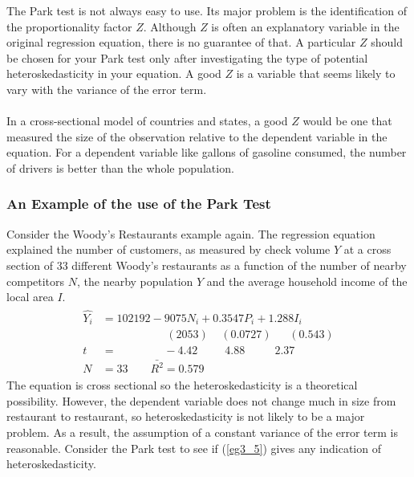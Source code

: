 \documentclass[11pt]{article}
\begin{document}
The Park test is not always easy to use. Its major problem is the identification of the proportionality factor $Z$. Although $Z$ is often an explanatory variable in the original regression equation, there is no guarantee of that. A particular $Z$ should be chosen for your Park test only after investigating the type of potential heteroskedasticity in your equation. A good $Z$ is a variable that seems likely to vary with the variance of the error term. \\ \\In a cross-sectional model of countries and states, a good $Z$ would be one that measured the size of the observation relative to the dependent variable in the equation. For a dependent variable like gallons of gasoline consumed, the number of drivers is better than the whole population. 
\subsubsection{An Example of the use of the Park Test}
Consider the Woody's Restaurants example again. The regression equation explained the number of customers, as measured by check volume $Y$ at a cross section of 33 different Woody's restaurants as a function of the number of nearby competitors $N$, the nearby population $Y$ and the average household income of the local area $I$. 
\begin{align}
\label{eg3_5}
\begin{split}
\hat{Y_i} &= 102192 - {9075N_i} + {0.3547P_i} + {1.288 I_i}\\
&\>\>\>\>\>\>\>\>\>\>\>\>\>\>\>\>\>\>\>\>\>\>\>\>\>\> (2053) \>\>\>\>\> (0.0727)\>\>\>\>\>\>\>(0.543)\\
t&=\>\>\>\>\>\>\>\>\>\>\>\>\>\>\>\>\>\>\> -4.42 \>\>\>\>\>\>\>\>\>\>\> 4.88\>\>\>\>\>\>\>\>\>\>\>\>2.37\\
N&=33\quad\quad\bar{R^2}=0.579
\end{split}
\end{align}
The equation is cross sectional so the heteroskedasticity is a theoretical possibility. However, the dependent variable does not change much in size from restaurant to restaurant, so heteroskedasticity is not likely to be a major problem. As a result, the assumption of a constant variance of the error term is reasonable. Consider the Park test to see if (\ref{eg3_5}) gives any indication of heteroskedasticity.
\end{document}
